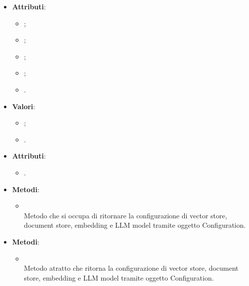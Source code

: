 \documentclass[10pt, a4paper]{article}
\begin{document}
\label{EmbeddingModelConfigurationDettaglio}
\begin{itemize}
    \item \textbf{Attributi}:
    \begin{itemize}
        \item {};
        \item {};
        \item {};
        \item {};
        \item {}.  
    \end{itemize}
\end{itemize}

\label{EmbeddingModelTypeDettaglio}
\begin{itemize}
    \item \textbf{Valori}:
    \begin{itemize}
        \item {};
        \item {}. 
    \end{itemize}
\end{itemize}


\label{GetConfigurationControllerDettaglio}
\begin{itemize}
    \item \textbf{Attributi}:
    \begin{itemize}
        \item {}.  
    \end{itemize}
    \item \textbf{Metodi}:
    \begin{itemize}
        \item {}\\
        Metodo che si occupa di ritornare la configurazione di vector store, document store, embedding e LLM model tramite oggetto Configuration.
    \end{itemize}
\end{itemize}
%
%
%
%
%
%
\label{GetConfigurationPortDettaglio}
\begin{itemize}
    \item \textbf{Metodi}:
    \begin{itemize}
        \item {}\\
        Metodo atratto che ritorna la configurazione di vector store, document store, embedding e LLM model tramite oggetto Configuration.
    \end{itemize}
\end{itemize}
\end{document}
